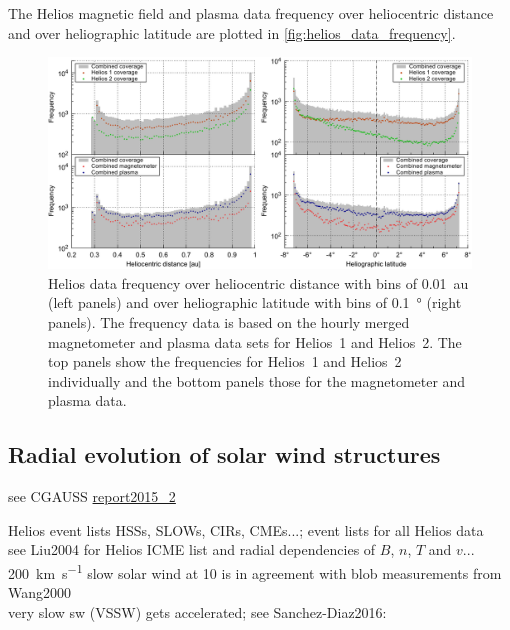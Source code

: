The Helios magnetic field and plasma data frequency over heliocentric distance and over heliographic latitude are plotted in \autoref{fig:helios_data_frequency}.\\
\begin{figure}[htb]
	\centering
	\includegraphics[width=\textwidth]{figures_of_mine/gnuplots/helios_data_frequency.pdf}
	\caption[]
	{Helios data frequency over heliocentric distance with bins of \SI{0.01}{au} (left panels) and over heliographic latitude with bins of \SI{0.1}{\degree} (right panels). The frequency data is based on the hourly merged magnetometer and plasma data sets for Helios~1 and Helios~2. The top panels show the frequencies for Helios~1 and Helios~2 individually and the bottom panels those for the magnetometer and plasma data.}
	\label{fig:helios_data_frequency}
\end{figure}


\subsection{Radial evolution of solar wind structures}
see CGAUSS \url{report2015_2}

Helios event lists HSSs, SLOWs, CIRs, CMEs...; event lists for all Helios data\\
see Liu2004 for Helios ICME list and radial dependencies of $B$, $n$, $T$ and $v$...\\

\SI{200}{\km\per\s} slow solar wind at \SI{10}{\Rs} is in agreement with blob measurements from Wang2000\\

very slow sw (VSSW) gets accelerated; see Sanchez-Diaz2016:\\


